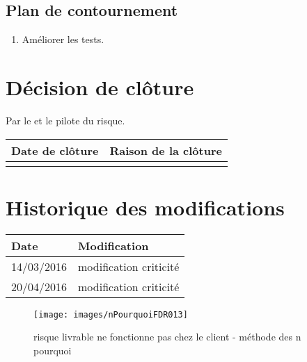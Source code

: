 \flushleft
\subsection*{Plan de contournement}

\begin{enumerate}
	\item Améliorer les tests. 
\end{enumerate}

\section*{Décision de clôture}
Par le \CP{} et le pilote du risque.
\begin{table}[H]
\centering
	\begin{tabularx}{16.8cm}{|X|X|}
	\hline
	\rowcolor{gray!40} Date de clôture & Raison de la clôture \\
	\hline
	  & \\
	\hline
	\end{tabularx}
\end{table}

\section*{Historique des modifications}
\begin{table}[H]
\centering
	\begin{tabularx}{16.8cm}{|X|X|}
	\hline
	\rowcolor{gray!40} Date & Modification \\
	\hline
	 14/03/2016 & modification criticité\\
	\hline
	 20/04/2016 & modification criticité\\
	\hline
	\end{tabularx}
\end{table}
\newpage


\begin{figure}
	\centering
	\texttt{[image: images/nPourquoiFDR013]}
	\caption{\label{livrable fonctionne pas client}risque livrable ne fonctionne pas chez le client - méthode des n pourquoi}
\end{figure}